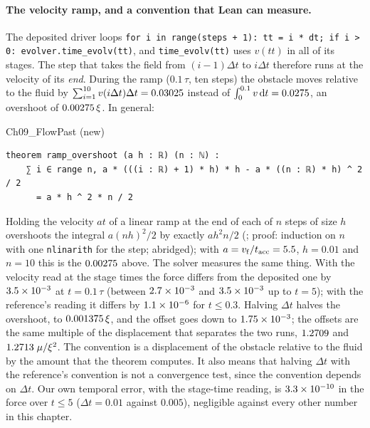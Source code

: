 \paragraph{The velocity ramp, and a convention that Lean can measure.} The deposited driver loops \texttt{for i in range(steps + 1): tt = i * dt; if i > 0: evolver.time\_evolv(tt)}, and \texttt{time\_evolv(tt)} uses $v(tt)$ in all of its stages. The step that takes the field from $(i-1)\Delta t$ to $i\Delta t$ therefore runs at the velocity of its \emph{end}. During the ramp ($0.1\,\tau$, ten steps) the obstacle moves relative to the fluid by $\sum_{i=1}^{10}v(i\Delta t)\Delta t=0.03025$ instead of $\int_0^{0.1}v\,\mathrm dt=0.0275$, an overshoot of $0.00275\,\xi$. In general:

\begin{leanbox}[title={Lean 4 \enspace FlowPast (new for this book)}]{Ch09\_FlowPast (new)}
\begin{lstlisting}[style=lean]
theorem ramp_overshoot (a h : ℝ) (n : ℕ) :
    ∑ i ∈ range n, a * (((i : ℝ) + 1) * h) * h - a * ((n : ℝ) * h) ^ 2 / 2
      = a * h ^ 2 * n / 2
\end{lstlisting}
\end{leanbox}

Holding the velocity $at$ of a linear ramp at the end of each of $n$ steps of size $h$ overshoots the integral $a(nh)^2/2$ by exactly $ah^2n/2$ (; proof: induction on $n$ with one \texttt{nlinarith} for the step; abridged); with $a=v_{\rm f}/t_{\rm acc}=5.5$, $h=0.01$ and $n=10$ this is the $0.00275$ above. The solver measures the same thing. With the velocity read at the stage times the force differs from the deposited one by $3.5\times10^{-3}$ at $t=0.1\,\tau$ (between $2.7\times10^{-3}$ and $3.5\times10^{-3}$ up to $t=5$); with the reference's reading it differs by $1.1\times10^{-6}$ for $t\le0.3$. Halving $\Delta t$ halves the overshoot, to $0.001375\,\xi$, and the offset goes down to $1.75\times10^{-3}$; the offsets are the same multiple of the displacement that separates the two runs, $1.2709$ and $1.2713\;\mu/\xi^2$. The convention is a displacement of the obstacle relative to the fluid by the amount that the theorem computes. It also means that halving $\Delta t$ with the reference's convention is not a convergence test, since the convention depends on $\Delta t$. Our own temporal error, with the stage-time reading, is $3.3\times10^{-10}$ in the force over $t\le5$ ($\Delta t=0.01$ against $0.005$), negligible against every other number in this chapter.

